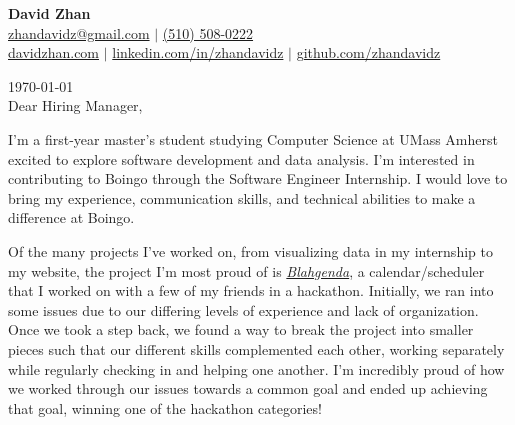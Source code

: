 \documentclass[letterpaper,12pt]{extarticle}
\begin{document}
\pagestyle{empty}




\begin{center}
\textbf{\Large David Zhan}\\[2pt] %
\href{mailto:zhandavidz@gmail.com}{zhandavidz@gmail.com} $|$ \href{tel:5105080222}{(510) 508-0222} \\
\href{https://davidzhan.com}{davidzhan.com} $|$ \href{https://www.linkedin.com/in/zhandavidz}{linkedin.com/in/zhandavidz} $|$ \href{https://github.com/zhandavidz}{github.com/zhandavidz}


\end{center}

\monthyeardate\today\\





Dear Hiring Manager,

I'm a first-year master's student studying Computer Science at UMass Amherst excited to explore software development and data analysis. I’m interested in contributing to Boingo through the Software Engineer Internship. I would love to bring my experience, communication skills, and technical abilities to make a difference at Boingo.

Of the many projects I’ve worked on, from visualizing data in my internship to my website, the project I’m most proud of is \textit{\href{https://blahgenda.dzhan.dev}{Blahgenda}}, a calendar/scheduler that I worked on with a few of my friends in a hackathon. Initially, we ran into some issues due to our differing levels of experience and lack of organization. Once we took a step back, we found a way to break the project into smaller pieces such that our different skills complemented each other, working separately while regularly checking in and helping one another. I’m incredibly proud of how we worked through our issues towards a common goal and ended up achieving that goal, winning one of the hackathon categories!
\end{document}
